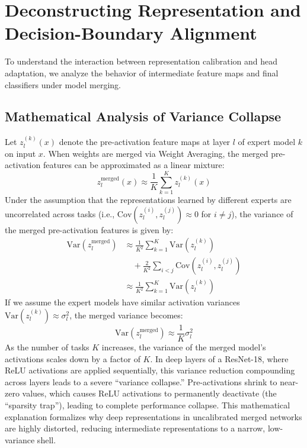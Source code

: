 \documentclass{article}
\theoremstyle{plain}
\theoremstyle{definition}
\theoremstyle{remark}
\begin{document}
\section{Deconstructing Representation and Decision-Boundary Alignment}
\label{sec:deconstruction}

To understand the interaction between representation calibration and head adaptation, we analyze the behavior of intermediate feature maps and final classifiers under model merging.

\subsection{Mathematical Analysis of Variance Collapse}
Let $z_l^{(k)}(x)$ denote the pre-activation feature maps at layer $l$ of expert model $k$ on input $x$. When weights are merged via Weight Averaging, the merged pre-activation features can be approximated as a linear mixture:
\begin{equation}
    z_l^{\text{merged}}(x) \approx \frac{1}{K}\sum_{k=1}^K z_l^{(k)}(x)
\end{equation}
Under the assumption that the representations learned by different experts are uncorrelated across tasks (i.e., $\text{Cov}(z_l^{(i)}, z_l^{(j)}) \approx 0$ for $i \neq j$), the variance of the merged pre-activation features is given by:
\begin{align}
    \text{Var}(z_l^{\text{merged}}) & \approx \frac{1}{K^2} \sum_{k=1}^K \text{Var}(z_l^{(k)}) \nonumber \\
    & \quad + \frac{2}{K^2}\sum_{i < j} \text{Cov}(z_l^{(i)}, z_l^{(j)}) \nonumber \\
    & \approx \frac{1}{K^2} \sum_{k=1}^K \text{Var}(z_l^{(k)})
\end{align}
If we assume the expert models have similar activation variances $\text{Var}(z_l^{(k)}) \approx \sigma_l^2$, the merged variance becomes:
\begin{equation}
    \text{Var}(z_l^{\text{merged}}) \approx \frac{1}{K} \sigma_l^2
\end{equation}
As the number of tasks $K$ increases, the variance of the merged model's activations scales down by a factor of $K$. In deep layers of a ResNet-18, where ReLU activations are applied sequentially, this variance reduction compounding across layers leads to a severe ``variance collapse.'' Pre-activations shrink to near-zero values, which causes ReLU activations to permanently deactivate (the ``sparsity trap''), leading to complete performance collapse. This mathematical explanation formalizes why deep representations in uncalibrated merged networks are highly distorted, reducing intermediate representations to a narrow, low-variance shell.
\end{document}
